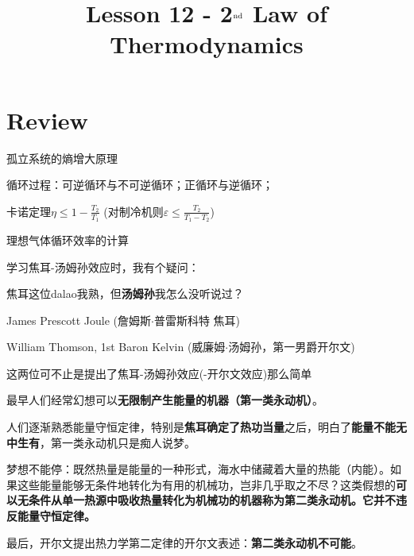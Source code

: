 \documentclass[CJK]{beamer}
\title{Lesson 12 - 2$^{\rm nd}$ Law of Thermodynamics}
\author{}
\date{}
\begin{document}

\section{Review}

\begin{frame}
\bch 
\bitem
\item{孤立系统的熵增大原理}
\item{循环过程：可逆循环与不可逆循环；正循环与逆循环；}
\item{卡诺定理$\eta \le 1 -\frac{T_2}{T_1}$ (对制冷机则$\varepsilon \le \frac{T_2}{T_1-T_2}$)}
\item{理想气体循环效率的计算}
\eitem
\ech
\end{frame}

\begin{frame}
\bch
学习焦耳-汤姆孙效应时，我有个疑问：

\skiplines

焦耳这位dalao我熟，但{\large \bf 汤姆孙}我怎么没听说过？

\ech
\end{frame}

\begin{frame}
\bch
\bitem
\item{James Prescott Joule (詹姆斯$\cdot$普雷斯科特 焦耳)

}
\item{William Thomson, 1st Baron Kelvin (威廉姆$\cdot$汤姆孙，第一男爵开尔文)

}
\eitem
这两位可不止是提出了焦耳-汤姆孙效应(-开尔文效应)那么简单
\ech
\end{frame}



\begin{frame}
\bch
\bitem
\item{最早人们经常幻想可以{\bf 无限制产生能量的机器（第一类永动机）}。}
\item{人们逐渐熟悉能量守恒定律，特别是{\bf 焦耳确定了热功当量}之后，明白了{\bf 能量不能无中生有}，第一类永动机只是痴人说梦。}
\item{梦想不能停：既然热量是能量的一种形式，海水中储藏着大量的热能（内能）。如果这些能量能够无条件地转化为有用的机械功，岂非几乎取之不尽？这类假想的{\bf 可以无条件从单一热源中吸收热量转化为机械功的机器称为第二类永动机。它并不违反能量守恒定律。}}
\item{最后，开尔文提出热力学第二定律的开尔文表述：{\bf 第二类永动机不可能}。}
\eitem

\ech
\end{frame}
\end{document}
